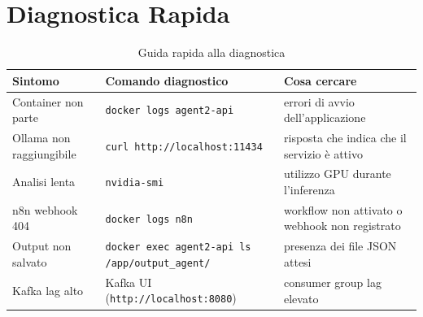 \documentclass[12pt,a4paper]{report}
\begin{document}
\section{Diagnostica Rapida}

\begin{table}[H]
\centering
\small
\renewcommand{\arraystretch}{1.25}
\setlength{\tabcolsep}{11pt}

\begin{tabularx}{\textwidth}{
  >{\raggedright\arraybackslash}p{4cm}
  >{\raggedright\arraybackslash}p{5.2cm}
  >{\raggedright\arraybackslash}X
}
\toprule
\textbf{Sintomo} & \textbf{Comando diagnostico} & \textbf{Cosa cercare} \\
\midrule
Container non parte
& \texttt{docker logs agent2-api}
& errori di avvio dell'applicazione \\

Ollama non raggiungibile
& \texttt{curl http://localhost:11434}
& risposta che indica che il servizio è attivo \\

Analisi lenta
& \texttt{nvidia-smi}
& utilizzo GPU durante l'inferenza \\

n8n webhook 404
& \texttt{docker logs n8n}
& workflow non attivato o webhook non registrato \\

Output non salvato
& \texttt{docker exec agent2-api ls /app/output\_agent/}
& presenza dei file JSON attesi \\

Kafka lag alto
& Kafka UI (\texttt{http://localhost:8080})
& consumer group lag elevato \\
\bottomrule
\end{tabularx}

\caption{Guida rapida alla diagnostica}
\label{tab:troubleshooting}
\end{table}


\end{document}
